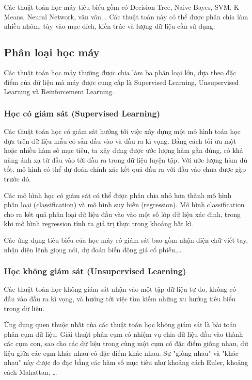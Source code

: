 \documentclass[12pt]{extreport}
\begin{document}
Các thuật toán học máy tiêu biểu gồm có Decision Tree, Naive Bayes, SVM, K-Means, Neural Network, vân vân... Các thuật toán này có thể được phân chia làm nhiều nhóm, tùy vào mục đích, kiến trúc và lượng dữ liệu cần sử dụng.

\subsection{Phân loại học máy}

Các thuật toán học máy thường được chia làm ba phân loại lớn, dựa theo đặc điểm của dữ liệu mà máy được cung cấp là Supervised Learning, Unsupervised Learning và Reinforcement Learning.

\subsubsection{Học có giám sát (Supervised Learning)}
\label{supervised-learning}

Các thuật toán học có giám sát hướng tới việc xây dựng một mô hình toán học dựa trên dữ liệu mẫu có sẵn đầu vào và đầu ra kì vọng. Bằng cách tối ưu một hoặc nhiều hàm số mục tiêu, ta xây dựng được ước lượng hàm gần đúng, có khả năng ánh xạ từ đầu vào tới đầu ra trong dữ liệu luyện tập. Với ước lượng hàm đủ tốt, mô hình có thể dự đoán chính xác kết quả đầu ra với đầu vào chưa được gặp trước đó.

Các mô hình học có giám sát có thể được phân chia nhỏ hơn thành mô hình phân loại (classification) và mô hình suy biến (regression). Mô hình classification cho ra kết quả phân loại dữ liệu đầu vào vào một số lớp dữ liệu xác định, trong khi mô hình regression tính ra giá trị thực trong khoảng bất kì.

Các ứng dụng tiêu biểu của học máy có giám sát bao gồm nhận diện chữ viết tay, nhận diện lệnh giọng nói, dự đoán biến động giá cổ phiếu,\dots

\subsubsection{Học không giám sát (Unsupervised Learning)}

Các thuật toán học không giám sát nhận vào một tập dữ liệu tự do, không có đầu vào đầu ra kì vọng, và hướng tới việc tìm kiếm những xu hướng tiêu biểu trong dữ liệu.

Ứng dụng quen thuộc nhất của các thuật toán học không giám sát là bài toán phân cụm dữ liệu. Giải thuật phân cụm có nhiệm vụ chia dữ liệu đầu vào thành các cụm con, sao cho các dữ liệu trong cùng một cụm có đặc điểm giống nhau, dữ liệu giữa các cụm khác nhau có đặc điểm khác nhau. Sự "giống nhau" và "khác nhau" này được đo đạc bằng các hàm số mục tiêu như khoảng cách Euler, khoảng cách Mahattan, \dots
\end{document}
